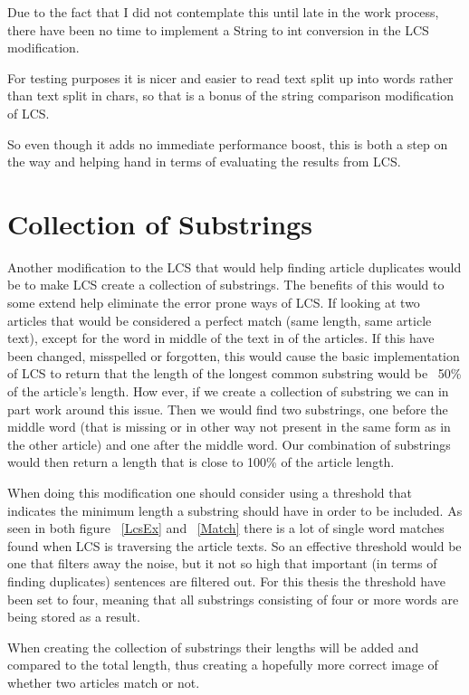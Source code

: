 Due to the fact that I did not contemplate this until late in the work process, there have been no time to implement a String to int conversion in the LCS modification.

For testing purposes it is nicer and easier to read text split up into words rather than text split in chars, so that is a bonus of the string comparison modification of LCS.

So even though it adds no immediate performance boost, this is both a step on the way and helping hand in terms of evaluating the results from LCS.

\section{Collection of Substrings}
Another modification to the LCS that would help finding article duplicates would be to make LCS create a collection of substrings. The benefits of this would to some extend help eliminate the error prone ways of LCS. If looking at two articles that would be considered a perfect match (same length, same article text), except for the word in middle of the text in of the articles. If this have been changed, misspelled or forgotten, this would cause the basic implementation of LCS to return that the length of the longest common substring would be ~50\% of the article's length. How ever, if we create a collection of substring we can in part work around this issue. Then we would find two substrings, one before the middle word (that is missing or in other way not present in the same form as in the other article) and one after the middle word. Our combination of substrings would then return a length that is close to 100\% of the article length.

When doing this modification one should consider using a threshold that indicates the minimum length a substring should have in order to be included. As seen in both figure ~\ref{LcsEx} and ~\ref{Match} there is a lot of single word matches found when LCS is traversing the article texts. So an effective threshold would be one that filters away the noise, but it not so high that important (in terms of finding duplicates) sentences are filtered out. For this thesis the threshold have been set to four, meaning that all substrings consisting of four or more words are being stored as a result.

When creating the collection of substrings their lengths will be added and compared to the total length, thus creating a hopefully more correct image of whether two articles match or not.

